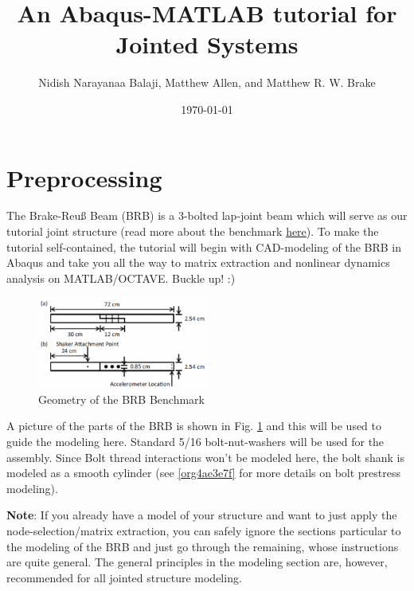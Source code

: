 \documentclass[11pt]{article}
\author{Nidish Narayanaa Balaji, Matthew Allen, and Matthew R. W. Brake}
\date{\today}
\title{An Abaqus-MATLAB tutorial for Jointed Systems}
\begin{document}
\maketitle
\tableofcontents

\pagebreak

\section{Preprocessing}
\label{sec:orgf97811d}

The Brake-Reuß Beam (BRB) is a 3-bolted lap-joint beam which will serve as our tutorial joint structure (read more about the benchmark \href{https://jointmechanics.org/index.php/Benchmarks\#The\_Brake-Reu\%C3\%9F\_Beams}{here}).
To make the tutorial self-contained, the tutorial will begin with CAD-modeling of the BRB in Abaqus and take you all the way to matrix extraction and nonlinear dynamics analysis on MATLAB/OCTAVE.
Buckle up! :)

\begin{figure}[htbp]
\centering
\includegraphics[width=0.5\textwidth]{./figs/300px-BRB.png}
\caption{\label{fig:orge29a531}Geometry of the BRB Benchmark}
\end{figure}

A picture of the parts of the BRB is shown in Fig. \ref{fig:orge29a531} and this will be used to guide the modeling here.
Standard 5/16 bolt-nut-washers will be used for the assembly. Since Bolt thread interactions won't be modeled here, the bolt shank is modeled as a smooth cylinder (see \ref{org4ae3e7f} for more details on bolt prestress modeling).

\textbf{Note}: If you already have a model of your structure and want to just apply the node-selection/matrix extraction, you can safely ignore the sections particular to the modeling of the BRB and just go through the remaining, whose instructions are quite general.
The general principles in the modeling section are, however, recommended for all jointed structure modeling.
\end{document}
